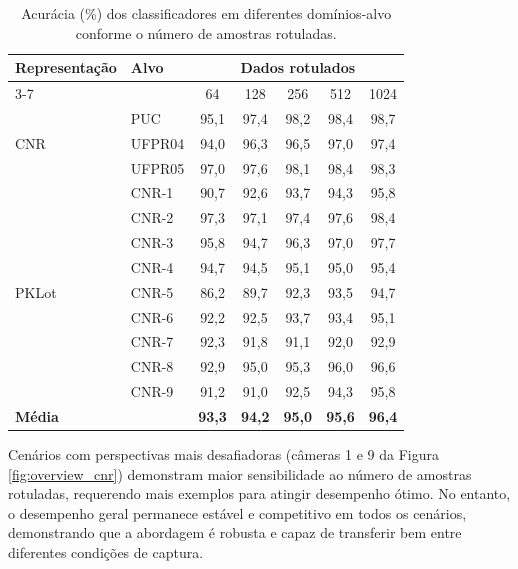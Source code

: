 \documentclass{article}
\begin{document}
\begin{table}[!h]
\centering
\caption{Acurácia (\%) dos classificadores em diferentes domínios-alvo conforme o número de amostras rotuladas.}
\label{tab:batch_vs_base}

\footnotesize
\renewcommand{\arraystretch}{0.95}

\begin{tabular}{llccccc}
\toprule
\multirow{2}{*}{\textbf{Representação}} &
\multirow{2}{*}{\textbf{Alvo}} &
\multicolumn{5}{c}{\textbf{Dados rotulados}} \\
\cmidrule(lr){3-7}
 & & 64 & 128 & 256 & 512 & 1024 \\
\midrule

\multirow{3}{*}{CNR}
& PUC    & 95,1 & 97,4 & 98,2 & 98,4 & 98,7 \\
& UFPR04 & 94,0 & 96,3 & 96,5 & 97,0 & 97,4 \\
& UFPR05 & 97,0 & 97,6 & 98,1 & 98,4 & 98,3 \\

\midrule

\multirow{9}{*}{PKLot}
& CNR-1 & 90,7 & 92,6 & 93,7 & 94,3 & 95,8 \\
& CNR-2 & 97,3 & 97,1 & 97,4 & 97,6 & 98,4 \\
& CNR-3 & 95,8 & 94,7 & 96,3 & 97,0 & 97,7 \\
& CNR-4 & 94,7 & 94,5 & 95,1 & 95,0 & 95,4 \\
& CNR-5 & 86,2 & 89,7 & 92,3 & 93,5 & 94,7 \\
& CNR-6 & 92,2 & 92,5 & 93,7 & 93,4 & 95,1 \\
& CNR-7 & 92,3 & 91,8 & 91,1 & 92,0 & 92,9 \\
& CNR-8 & 92,9 & 95,0 & 95,3 & 96,0 & 96,6 \\
& CNR-9 & 91,2 & 91,0 & 92,5 & 94,3 & 95,8 \\

\midrule
\multicolumn{2}{l}{\textbf{Média}} &
\textbf{93,3} &
\textbf{94,2} &
\textbf{95,0} &
\textbf{95,6} &
\textbf{96,4} \\
\bottomrule
\end{tabular}

\end{table}

Cenários com perspectivas mais desafiadoras (câmeras 1 e 9 da Figura \ref{fig:overview_cnr}) demonstram maior sensibilidade ao número de amostras rotuladas, requerendo mais exemplos para atingir desempenho ótimo. No entanto, o desempenho geral permanece estável e competitivo em todos os cenários, demonstrando que a abordagem é robusta e capaz de transferir bem entre diferentes condições de captura.
\end{document}
